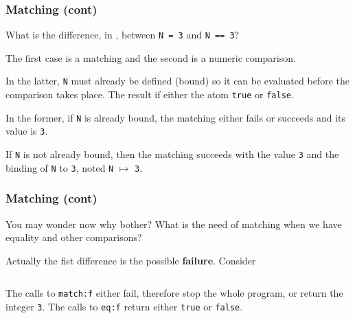 %
\begin{frame}[containsverbatim]
\frametitle{Matching (cont)}

What is the difference, in \Erlang, between
\verb|N = 3| and \verb|N == 3|?

\bigskip

The first case is a matching and the second is a numeric
comparison. 

\bigskip

In the latter, \texttt{N} must already be defined (bound) so it
can be evaluated before the comparison takes place. The result if
either the atom \texttt{true} or \texttt{false}.

\bigskip

In the former, if \texttt{N} is already bound, the matching either
fails or succeeds and its value is \texttt{3}. 

\bigskip

If \texttt{N} is not already bound, then the matching succeeds with
the value \texttt{3} and the binding of \texttt{N} to \texttt{3},
noted \texttt{N} \(\mapsto\) \texttt{3}.

\end{frame}

%
\begin{frame}
\frametitle{Matching (cont)}

You may wonder now why bother? What is the need of matching when we
have equality and other comparisons?

\bigskip

Actually the fist difference is the possible
\textbf{failure}. Consider
\begin{columns}
\end{columns}

\bigskip

The calls to \texttt{match:f} either fail, therefore stop the whole
program, or return the integer \texttt{3}. The calls to
\texttt{eq:f} return either \texttt{true} or \texttt{false}.

\end{frame}

